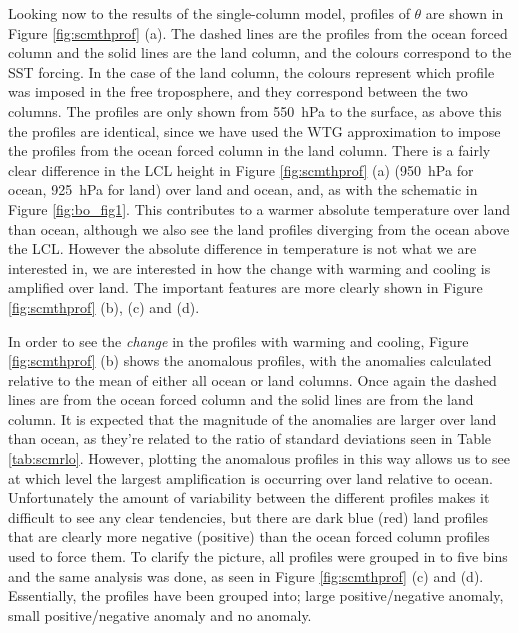Looking now to the results of the single-column model, profiles of $\theta$ are 
shown in Figure \ref{fig:scmthprof} (a). The dashed lines are the profiles from 
the ocean forced column and the solid lines are the land column, and the colours 
correspond to the SST forcing. In the case of the land column, the colours 
represent which profile was imposed in the free troposphere, and they correspond 
between the two columns. The profiles are only shown from 
\SI{550}{\hecto\pascal} to the surface, as above this the profiles are 
identical, since we have used the WTG approximation to impose the profiles from 
the ocean forced column in the land column. There is a fairly clear difference 
in the LCL height in Figure \ref{fig:scmthprof} (a) (\SI{950}{\hecto\pascal} for 
ocean, \SI{925}{\hecto\pascal} for land) over land and ocean, and, as with the 
schematic in Figure \ref{fig:bo_fig1}. This contributes to a warmer absolute 
temperature over land than ocean, although we also see the land profiles 
diverging from the ocean above the LCL.  However the absolute difference in 
temperature is not what we are interested in, we are interested in how the 
change with warming and cooling is amplified over land.  The important features 
are more clearly shown in Figure \ref{fig:scmthprof} (b), (c) and (d).

In order to see the \textit{change} in the profiles with warming and cooling, 
Figure \ref{fig:scmthprof} (b) shows the anomalous profiles, with the anomalies 
calculated relative to the mean of either all ocean or land columns. Once again 
the dashed lines are from the ocean forced column and the solid lines are from 
the land column. It is expected that the magnitude of the anomalies are larger 
over land than ocean, as they're related to the ratio of standard deviations 
seen in Table \ref{tab:scmrlo}. However, plotting the anomalous profiles in this 
way allows us to see at which level the largest amplification is occurring over 
land relative to ocean.  Unfortunately the amount of variability between the 
different profiles makes it difficult to see any clear tendencies, but there are 
dark blue (red) land profiles that are clearly more negative (positive) than the 
ocean forced column profiles used to force them. To clarify the picture, all 
profiles were grouped in to five bins and the same analysis was done, as seen in 
Figure \ref{fig:scmthprof} (c) and (d). Essentially, the profiles have been 
grouped into; large positive/negative anomaly, small positive/negative anomaly 
and no anomaly.  

